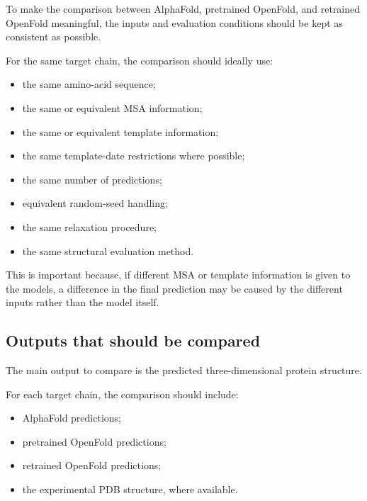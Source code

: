 \documentclass[11pt,a4paper]{article}
\begin{document}
To make the comparison between AlphaFold, pretrained OpenFold, and retrained OpenFold meaningful, the inputs and evaluation conditions should be kept as consistent as possible.

For the same target chain, the comparison should ideally use:

\begin{itemize}[leftmargin=*]

    \item the same amino-acid sequence;

    \item the same or equivalent MSA information;

    \item the same or equivalent template information;

    \item the same template-date restrictions where possible;

    \item the same number of predictions;

    \item equivalent random-seed handling;

    \item the same relaxation procedure;

    \item the same structural evaluation method.

\end{itemize}

This is important because, if different MSA or template information is given to the models, a difference in the final prediction may be caused by the different inputs rather than the model itself.


\subsection{Outputs that should be compared}

The main output to compare is the predicted three-dimensional protein structure.

For each target chain, the comparison should include:

\begin{itemize}[leftmargin=*]

    \item AlphaFold predictions;

    \item pretrained OpenFold predictions;

    \item retrained OpenFold predictions;

    \item the experimental PDB structure, where available.

\end{itemize}
\end{document}
